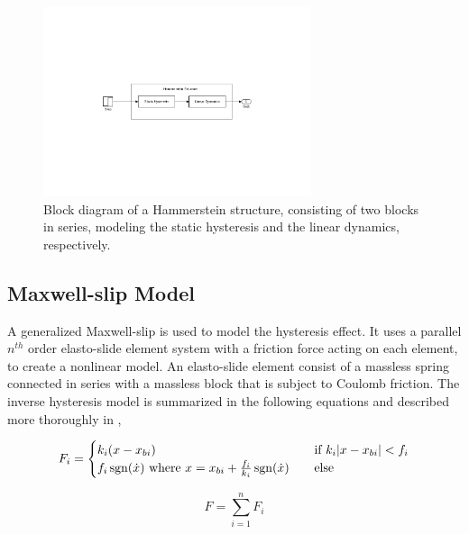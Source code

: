 \begin{figure}[h]
  \centering %
  \includegraphics[width=0.7\textwidth, trim=8cm 8cm 7.73cm 8cm, clip=true]{fig/matlab/hammerstein}
  \caption{\label{fig:hammerstein}Block diagram of a Hammerstein structure, consisting of two blocks in series, modeling the static hysteresis and the linear dynamics, respectively.}
\end{figure}

\subsection{Maxwell-slip Model}
\label{sec:maxwell}
A generalized Maxwell-slip is used to model the hysteresis effect. It uses a parallel $n^{th}$ order elasto-slide element system with a friction force acting on each element, to create a nonlinear model. An elasto-slide element consist of a massless spring connected in series with a massless block that is subject to Coulomb friction. The inverse hysteresis model is summarized in the following equations and described more thoroughly in \citep{Ru:2016},

\begin{equation}
  \label{eq:maxwell_slip}
  F_i =
  \begin{cases}
    k_i(x - x_{bi}) & \quad \text{if }  k_i|x - x_{bi}| < f_i\\
    f_i\operatorname{sgn}(\dot{x}) \text{ where }  x = x_{bi} + \frac{f_i}{k_i}\operatorname{sgn}(\dot{x})  & \quad \text{else}\\
  \end{cases}
\end{equation}

\begin{equation}
  \label{eq:maxwell_sum}
  F = \displaystyle\sum_{i=1}^{n} F_i
\end{equation}

